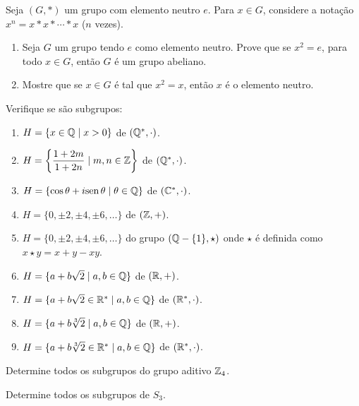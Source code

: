 \documentclass[12pt]{article}
\begin{document}
\vesp

\questao{} Seja $(G,*)$ um grupo com elemento neutro $e$. Para $x\in
G$, considere a nota{\c c}{\~a}o $x^n=x*x*\cdots *x$ ($n$ vezes).
\begin{enumerate}[label=({\alph*})]
\item Seja $G$ um grupo tendo $e$ como elemento neutro. Prove que se
$x^2=e$, para todo $x\in G$, ent{\~a}o $G$ {\'e} um grupo abeliano.
\item Mostre que se $x\in G$ {\'e} tal que $x^2=x$, ent{\~a}o $x$ {\'e} o elemento neutro.
\end{enumerate}

\vesp

\questao{} Verifique se s\~ao subgrupos:
\begin{enumerate}[label=({\alph*})]
	\item $H = \{x \in \mathbb{Q} \mid x > 0\}$ de $(\mathbb{Q}^*,\cdot)$.
	\item $H = \left\{\dfrac{1 + 2m}{1 + 2n} \mid m, n \in \mathbb{Z}\right\}$ de $(\mathbb{Q}^*,\cdot)$.
	\item $H = \{\cos\theta + i{\rm sen\,}\theta \mid \theta \in \mathbb{Q}\}$ de $(\mathbb{C}^*,\cdot)$.
	\item $H = \{0, \pm 2, \pm 4, \pm 6, \dots\}$ de $(\mathbb{Z},+)$.
	\item $H = \{0, \pm 2, \pm 4, \pm 6, \dots\}$ do grupo $(\mathbb{Q} - \{1\},\star)$ onde $\star$ \'e definida como $x \star y = x + y - xy$.
	\item $H = \{a + b\sqrt{2} \mid a, b \in \mathbb{Q}\}$ de $(\mathbb{R},+)$.
	\item $H = \{a + b\sqrt{2} \in \mathbb{R}^* \mid a, b \in \mathbb{Q}\}$ de $(\mathbb{R}^*,\cdot)$.
	\item $H = \{a + b\sqrt[3]{2} \mid a, b \in \mathbb{Q}\}$ de $(\mathbb{R},+)$.
	\item $H = \{a + b\sqrt[3]{2} \in \mathbb{R}^* \mid a, b \in \mathbb{Q}\}$ de $(\mathbb{R}^*,\cdot)$.
\end{enumerate}

\vesp

\questao{} Determine todos os subgrupos do grupo aditivo $\mathbb{Z}_4$.

\vesp

\questao{} Determine todos os subgrupos de $S_3$.

\vesp
\end{document}
